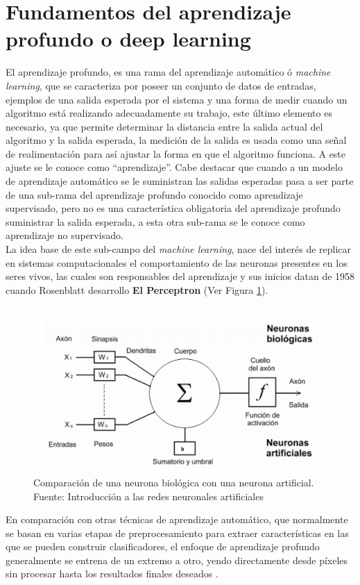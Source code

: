 \section{Fundamentos del aprendizaje profundo o deep learning}
El aprendizaje profundo, es una rama del aprendizaje automático ó \textit{machine learning}, que se caracteriza por poseer un conjunto de datos de entradas, ejemplos de una salida esperada por el sistema y una forma de medir cuando un algoritmo está realizando adecuadamente su trabajo, este último elemento es necesario, ya que permite determinar la distancia entre la salida actual del algoritmo y la salida esperada, la medición de la salida es usada como una señal de realimentación para así ajustar la forma en que el algoritmo funciona. A este ajuste se le conoce como ``aprendizaje''. Cabe destacar que cuando a un modelo de aprendizaje automático se le suministran las salidas esperadas pasa a ser parte de una sub-rama del aprendizaje profundo conocido como aprendizaje supervisado, pero no es una característica obligatoria del aprendizaje profundo suministrar la salida esperada, a esta otra sub-rama se le conoce como aprendizaje no supervisado.
\\
La idea base de este sub-campo del \textit{machine learning}, nace del interés de replicar en sistemas computacionales el comportamiento de las neuronas presentes en los seres vivos, las cuales son responsables del aprendizaje y sus inicios datan de 1958 cuando Rosenblatt desarrollo \textbf{El Perceptron} (Ver Figura \ref{perceptron}).
\begin{figure}[H]
    \centering
    \includegraphics[scale=0.35]{Recursos/perceptron.png}
    \caption[Comparación de una neurona biológica con una neurona artificial.]{Comparación de una neurona biológica con una neurona artificial. {\footnotesize Fuente: Introducción a las redes neuronales artificiales \cite{SierraRamosJM}}}
    \label{perceptron}
\end{figure}
En comparación con otras técnicas de aprendizaje automático, que normalmente se basan en varias
etapas de preprocesamiento para extraer características en las que se pueden construir clasificadores, el enfoque de aprendizaje profundo
generalmente se entrena de un extremo a otro, yendo directamente desde píxeles sin procesar hasta los resultados finales deseados \cite{Szeliski2022}.
